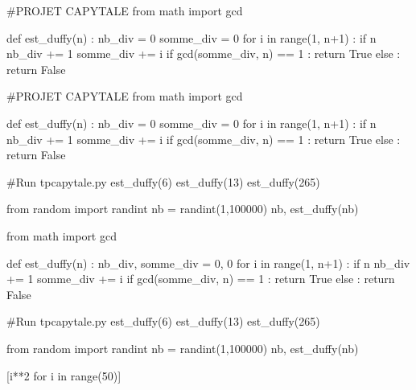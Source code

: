 \documentclass[french,a4paper,10pt]{article}
\begin{document}
{\small\begin{codehigh}
\begin{PitonThonnyEditor}[NomFichier=tpcapytale.py,Largeur=12cm]{}
#PROJET CAPYTALE
from math import gcd

def est_duffy(n) :
    nb_div = 0
    somme_div = 0
    for i in range(1, n+1) :
        if n %
            nb_div += 1
            somme_div += i
    if gcd(somme_div, n) == 1 :
        return True
    else :
        return False
\end{PitonThonnyEditor}
\end{codehigh}}

\begin{PitonThonnyEditor}[NomFichier=tpcapytale.py,Largeur=12cm]{}
#PROJET CAPYTALE
from math import gcd

def est_duffy(n) :
	nb_div = 0
	somme_div = 0
	for i in range(1, n+1) :
		if n %
			nb_div += 1
			somme_div += i
	if gcd(somme_div, n) == 1 :
		return True
	else :
		return False
\end{PitonThonnyEditor}

{\small\begin{codehigh}
\begin{PitonThonnyConsole}[IntroConsole={python 3.8.10},Largeur=12cm]{}
#Run tpcapytale.py
est_duffy(6)
est_duffy(13)
est_duffy(265)

from random import randint
nb = randint(1,100000)
nb, est_duffy(nb)
\end{PitonThonnyConsole}
\end{codehigh}}

\begin{python}
from math import gcd

def est_duffy(n) :
	nb_div, somme_div = 0, 0
	for i in range(1, n+1) :
		if n %
			nb_div += 1
			somme_div += i
	if gcd(somme_div, n) == 1 :
		return True
	else :
		return False
	
\end{python}
\begin{PitonThonnyConsole}[IntroConsole={python 3.8.10},Largeur=12cm]{}
#Run tpcapytale.py
est_duffy(6)
est_duffy(13)
est_duffy(265)

from random import randint
nb = randint(1,100000)
nb, est_duffy(nb)
\end{PitonThonnyConsole}

{\small\begin{codehigh}
\begin{PitonThonnyConsole}[Largeur=8cm]{}
[i**2 for i in range(50)]
\end{PitonThonnyConsole}
\end{codehigh}}
\end{document}
